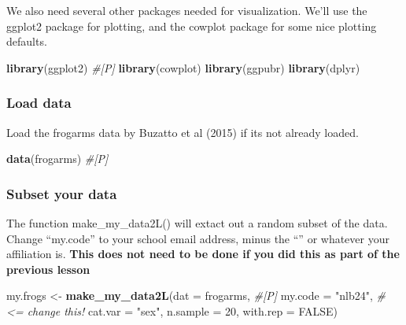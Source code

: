 \documentclass[]{book}
\newenvironment{Shaded}{\begin{snugshade}}{\end{snugshade}}
\newcommand{\KeywordTok}[1]{\textcolor[rgb]{0.13,0.29,0.53}{\textbf{#1}}}
\newcommand{\DataTypeTok}[1]{\textcolor[rgb]{0.13,0.29,0.53}{#1}}
\newcommand{\DecValTok}[1]{\textcolor[rgb]{0.00,0.00,0.81}{#1}}
\newcommand{\StringTok}[1]{\textcolor[rgb]{0.31,0.60,0.02}{#1}}
\newcommand{\CommentTok}[1]{\textcolor[rgb]{0.56,0.35,0.01}{\textit{#1}}}
\newcommand{\OtherTok}[1]{\textcolor[rgb]{0.56,0.35,0.01}{#1}}
\newcommand{\NormalTok}[1]{#1}
\theoremstyle{definition}
\theoremstyle{definition}
\theoremstyle{definition}
\theoremstyle{remark}
\begin{document}
We also need several other packages needed for visualization. We'll use
the ggplot2 package for plotting, and the cowplot package for some nice
plotting defaults.

\begin{Shaded}
\begin{Highlighting}[]
\KeywordTok{library}\NormalTok{(ggplot2) }\CommentTok{#[P]}
\KeywordTok{library}\NormalTok{(cowplot)}
\KeywordTok{library}\NormalTok{(ggpubr)}
\KeywordTok{library}\NormalTok{(dplyr)}
\end{Highlighting}
\end{Shaded}

\subsubsection{Load data}\label{load-data-2}

Load the frogarms data by Buzatto et al (2015) if its not already
loaded.

\begin{Shaded}
\begin{Highlighting}[]
\KeywordTok{data}\NormalTok{(frogarms) }\CommentTok{#[P]}
\end{Highlighting}
\end{Shaded}

\subsubsection{Subset your data}\label{subset-your-data-2}

The function make\_my\_data2L() will extact out a random subset of the
data. Change ``my.code'' to your school email address, minus the
``\citet{pitt.edu}'' or whatever your affiliation is. \textbf{This does
not need to be done if you did this as part of the previous lesson}

\begin{Shaded}
\begin{Highlighting}[]
\NormalTok{my.frogs <-}\StringTok{ }\KeywordTok{make_my_data2L}\NormalTok{(}\DataTypeTok{dat =}\NormalTok{ frogarms,    }\CommentTok{#[P]}
                           \DataTypeTok{my.code =} \StringTok{"nlb24"}\NormalTok{, }\CommentTok{# <=  change this!}
                           \DataTypeTok{cat.var =} \StringTok{"sex"}\NormalTok{,}
                           \DataTypeTok{n.sample =} \DecValTok{20}\NormalTok{, }
                           \DataTypeTok{with.rep =} \OtherTok{FALSE}\NormalTok{)}
\end{Highlighting}
\end{Shaded}
\end{document}
